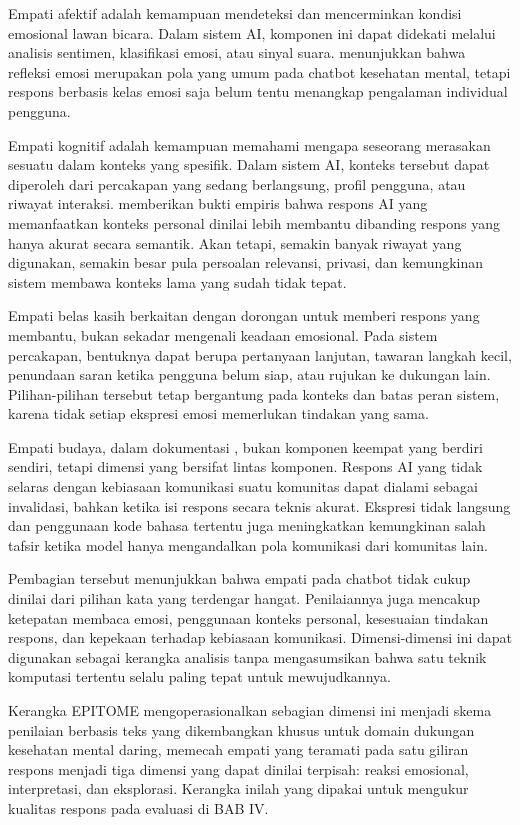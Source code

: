 Empati afektif adalah kemampuan mendeteksi dan mencerminkan kondisi emosional lawan bicara. Dalam sistem AI, komponen ini dapat didekati melalui analisis sentimen, klasifikasi emosi, atau sinyal suara. \textcite{inkster2018} menunjukkan bahwa refleksi emosi merupakan pola yang umum pada chatbot kesehatan mental, tetapi respons berbasis kelas emosi saja belum tentu menangkap pengalaman individual pengguna.

Empati kognitif adalah kemampuan memahami mengapa seseorang merasakan sesuatu dalam konteks yang spesifik. Dalam sistem AI, konteks tersebut dapat diperoleh dari percakapan yang sedang berlangsung, profil pengguna, atau riwayat interaksi. \textcite{sharma2023} memberikan bukti empiris bahwa respons AI yang memanfaatkan konteks personal dinilai lebih membantu dibanding respons yang hanya akurat secara semantik. Akan tetapi, semakin banyak riwayat yang digunakan, semakin besar pula persoalan relevansi, privasi, dan kemungkinan sistem membawa konteks lama yang sudah tidak tepat.

Empati belas kasih berkaitan dengan dorongan untuk memberi respons yang membantu, bukan sekadar mengenali keadaan emosional. Pada sistem percakapan, bentuknya dapat berupa pertanyaan lanjutan, tawaran langkah kecil, penundaan saran ketika pengguna belum siap, atau rujukan ke dukungan lain. Pilihan-pilihan tersebut tetap bergantung pada konteks dan batas peran sistem, karena tidak setiap ekspresi emosi memerlukan tindakan yang sama.

Empati budaya, dalam dokumentasi \textcite{pendse2022}, bukan komponen keempat yang berdiri sendiri, tetapi dimensi yang bersifat lintas komponen. Respons AI yang tidak selaras dengan kebiasaan komunikasi suatu komunitas dapat dialami sebagai invalidasi, bahkan ketika isi respons secara teknis akurat. Ekspresi tidak langsung dan penggunaan kode bahasa tertentu juga meningkatkan kemungkinan salah tafsir ketika model hanya mengandalkan pola komunikasi dari komunitas lain.

Pembagian tersebut menunjukkan bahwa empati pada chatbot tidak cukup dinilai dari pilihan kata yang terdengar hangat. Penilaiannya juga mencakup ketepatan membaca emosi, penggunaan konteks personal, kesesuaian tindakan respons, dan kepekaan terhadap kebiasaan komunikasi. Dimensi-dimensi ini dapat digunakan sebagai kerangka analisis tanpa mengasumsikan bahwa satu teknik komputasi tertentu selalu paling tepat untuk mewujudkannya.

Kerangka EPITOME \parencite{sharma2020epitome} mengoperasionalkan sebagian dimensi ini menjadi skema penilaian berbasis teks yang dikembangkan khusus untuk domain dukungan kesehatan mental daring, memecah empati yang teramati pada satu giliran respons menjadi tiga dimensi yang dapat dinilai terpisah: reaksi emosional, interpretasi, dan eksplorasi. Kerangka inilah yang dipakai untuk mengukur kualitas respons pada evaluasi di BAB IV.

